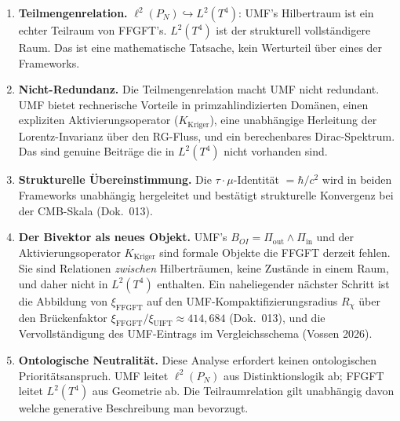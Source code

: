 \begin{enumerate}

  \item \textbf{Teilmengenrelation.}
    $\ell^2(P_N) \hookrightarrow L^2(T^4)$: UMF's Hilbertraum ist ein echter
    Teilraum von FFGFT's. $L^2(T^4)$ ist der strukturell vollständigere Raum.
    Das ist eine mathematische Tatsache, kein Werturteil über eines der
    Frameworks.

  \item \textbf{Nicht-Redundanz.}
    Die Teilmengenrelation macht UMF nicht redundant. UMF bietet rechnerische
    Vorteile in primzahlindizierten Domänen, einen expliziten Aktivierungsoperator
    ($K_\text{Kriger}$), eine unabhängige Herleitung der Lorentz-Invarianz über
    den RG-Fluss, und ein berechenbares Dirac-Spektrum. Das sind genuine Beiträge
    die in $L^2(T^4)$ nicht vorhanden sind.

  \item \textbf{Strukturelle Übereinstimmung.}
    Die \texorpdfstring{$\tau\cdot\mu$}{tau.mu}-Identität $= \hbar/c^2$
    wird in beiden Frameworks unabhängig hergeleitet und bestätigt strukturelle
    Konvergenz bei der CMB-Skala (Dok.~013).

  \item \textbf{Der Bivektor als neues Objekt.}
    UMF's $B_{OI} = \Pi_\text{out} \wedge \Pi_\text{in}$ und der
    Aktivierungsoperator $K_\text{Kriger}$ sind formale Objekte die FFGFT
    derzeit fehlen. Sie sind Relationen \emph{zwischen} Hilberträumen, keine
    Zustände in einem Raum, und daher nicht in $L^2(T^4)$ enthalten. Ein
    naheliegender nächster Schritt ist die Abbildung von $\xi_\text{FFGFT}$
    auf den UMF-Kompaktifizierungsradius $R_\chi$ über den Brückenfaktor
    $\xi_\text{FFGFT}/\xi_\text{UIFT} \approx 414{,}684$ (Dok.~013),
    und die Vervollständigung des UMF-Eintrags im Vergleichsschema
    (Vossen 2026).

  \item \textbf{Ontologische Neutralität.}
    Diese Analyse erfordert keinen ontologischen Prioritätsanspruch. UMF leitet
    $\ell^2(P_N)$ aus Distinktionslogik ab; FFGFT leitet $L^2(T^4)$ aus
    Geometrie ab. Die Teilraumrelation gilt unabhängig davon welche generative
    Beschreibung man bevorzugt.

\end{enumerate}
